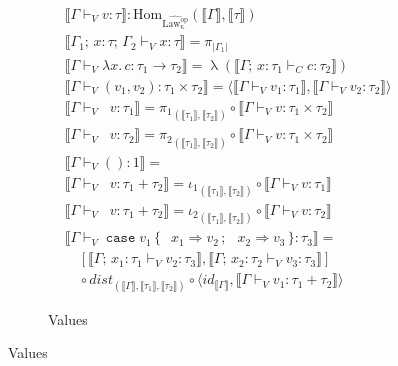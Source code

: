 \documentclass[acmsmall, screen, review, anonymous]{acmart}
\theoremstyle{definition}
\newcommand{\arr}{\rightarrow}
\newcommand{\lawcop}{\mathrm{Law_{\kappa}^{op}}}
\newcommand{\pshlawcop}{\widehat{\lawcop}}
\newcommand{\homset}[3]{\mathrm{Hom}_{#1}(#2, #3)}
\newcommand{\sem}[1]{\llbracket #1 \rrbracket}
\newcommand{\seq}{\,;\,}
\newcommand{\fstname}{\mathop{\pi_1}}
\newcommand{\fst}[1]{\fstname #1}
\newcommand{\fstc}[2]{{\pi_1}_{(#1, #2)}}
\newcommand{\sndname}{\mathop{\pi_2}}
\newcommand{\snd}[1]{\sndname #1}
\newcommand{\sndc}[2]{{\pi_2}_{(#1, #2)}}
\newcommand{\proj}[1]{\pi_{#1}}
\newcommand{\inlname}{\mathop{\mathtt{in}_L}}
\newcommand{\inl}[1]{\inlname #1}
\newcommand{\inrname}{\mathop{\mathtt{in}_R}}
\newcommand{\inr}[1]{\inrname #1}
\newcommand{\bang}[1]{\mathop{!_{#1}}}
\newcommand{\inlc}[2]{{\iota_1}_{(#1, #2)}}
\newcommand{\inrc}[2]{{\iota_2}_{(#1, #2)}}
\newcommand{\copair}[2]{[#1, #2]}
\newcommand{\distc}[3]{\mathit{dist}_{(#1, #2, #3)}}
\newcommand{\casename}{\mathtt{case}}
\newcommand{\case}[5]{\mathop{\casename} #1 \,\{\,\inl{#2} \Rightarrow #3 \seq \inr{#4} \Rightarrow #5 \,\}}
\newcommand{\types}{\mathrel{:}}
\newcommand{\abs}[2]{\lambda#1.\,#2}
\newcommand{\ccons}[2]{#1;\,#2}
\newcommand{\lbind}[3]{\ccons{#1}{#2\types#3}}
\newcommand{\turnv}{\mathrel{\vdash_V}}
\newcommand{\turnc}{\mathrel{\vdash_C}}
\newcommand{\currying}[1]{\mathop{\lambda}(#1)}
\begin{document}
\begin{figure}
\begin{subfigure}{\textwidth}
\begin{align*}
&\sem{\Gamma \turnv v \types \tau} \mathrel{:} \homset{\pshlawcop}{\sem{\Gamma}}{\sem{\tau}} \\
&\sem{\ccons{\lbind{\Gamma_1}{x}{\tau}}{\Gamma_2} \turnv x \types \tau} = \proj{|\Gamma_1|} \\
&\sem{\Gamma \turnv \abs{x}{c} \types \tau_1 \arr \tau_2} = \currying{\sem{\lbind{\Gamma}{x}{\tau_1} \turnc c \types \tau_2}}\\
&\sem{\Gamma \turnv (v_1, v_2) \types \tau_1 \times \tau_2} =
  \langle \sem{\Gamma \turnv v_1 \types \tau_1},
          \sem{\Gamma \turnv v_2 \types \tau_2} \rangle \\
&\sem{\Gamma \turnv \fst{v} \types \tau_1} = \fstc{\sem{\tau_1}}{\sem{\tau_2}} \circ \sem{\Gamma \turnv v \types \tau_1 \times \tau_2}\\
&\sem{\Gamma \turnv \snd{v} \types \tau_2} = \sndc{\sem{\tau_1}}{\sem{\tau_2}} \circ \sem{\Gamma \turnv v \types \tau_1 \times \tau_2} \\
&\sem{\Gamma \turnv () \types 1} = \bang{\sem{\Gamma}} \\
&\sem{\Gamma \turnv \inl{v} \types \tau_1 + \tau_2} =
  \inlc{\sem{\tau_1}}{\sem{\tau_2}} \circ \sem{\Gamma \turnv v \types \tau_1} \\
&\sem{\Gamma \turnv \inr{v} \types \tau_1 + \tau_2} =
  \inrc{\sem{\tau_1}}{\sem{\tau_2}} \circ \sem{\Gamma \turnv v \types \tau_2} \\
&\sem{\Gamma \turnv \case{v_1}{x_1}{v_2}{x_2}{v_3} \types \tau_3} = {} \\
&\quad \copair{\sem{\lbind{\Gamma}{x_1}{\tau_1} \turnv v_2 \types \tau_3}}
         {\sem{\lbind{\Gamma}{x_2}{\tau_2} \turnv v_3 \types \tau_3}} \\
&\quad \circ \distc{\sem{\Gamma}}{\sem{\tau_1}}{\sem{\tau_2}}
   \circ \langle id_{\sem{\Gamma}},
                 \sem{\Gamma \turnv v_1 \types \tau_1 + \tau_2} \rangle
\end{align*}
\caption{Values}
\end{subfigure}


\end{figure}
\end{document}
